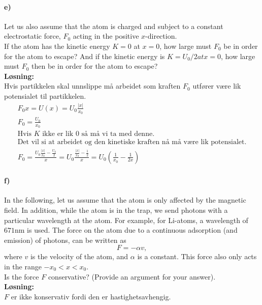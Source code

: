 \documentclass[11pt, A4paper,norsk]{article}
\begin{document}
		\paragraph{e)}
			\begin{flushleft}
Let us also assume that the atom is charged and subject to a constant electrostatic force, $F_0$ acting in the positive $x$-direction. \\
If the atom has the kinetic energy $K = 0$ at $x = 0$, how large must $F_0$ be in order for the atom to escape? And if the kinetic energy is $K = U_0/2 at x = 0$, how large must $F_0$ then be in order for the atom to escape? \\
\vspace{1mm}
\textbf{Løsning:} \\
\vspace{1mm}
Hvis partikkelen skal unnslippe må  arbeidet som kraften $F_0$ utfører være lik potensialet til partikkelen.
				\begin{align}
F_0 x = U(x) = U_0 \frac{|x|}{x_0} \nonumber \\
F_0 = \frac{U_0}{x_0} \nonumber \\
\text{Hvis $K$ ikke er lik $0$ så må vi ta med denne}. \nonumber \\
\text{Det vil si at arbeidet og den kinetiske kraften nå må være lik potensialet.} \nonumber \\
F_0 = \frac{U_0 \frac{|x|}{x_0} - \frac{U_0}{2}}{x} = U_0\frac{\frac{|x|}{x_0} - \frac{1}{2}}{x} = U_0 \left(\frac{1}{x_0} - \frac{1}{2x} \right) \nonumber
				\end{align}
			\end{flushleft}











		\paragraph{f)}
			\begin{flushleft}
In the following, let us assume that the atom is only affected by the magnetic field. In addition, while the atom is in the trap, we send photons with a particular wavelength at the atom. For example, for Li-atoms, a wavelength of $671$nm is used. The force on the atom due to a continuous adsorption (and emission) of photons, can be written as
$$F = -\alpha v,$$ 
where $v$ is the velocity of the atom, and $\alpha$ is a constant. This force also only acts in the range $-x_0 < x < x_0$. \\
Is the force $F$ conservative? (Provide an argument for your answer). \\
\vspace{1mm}
\textbf{Løsning:} \\
\vspace{1mm}
$F$ er ikke konservativ fordi den er hastighetsavhengig.
			\end{flushleft}
\end{document}
